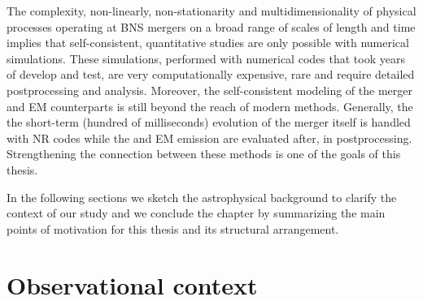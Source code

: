 The complexity, non-linearly, non-stationarity and multidimensionality of physical 
processes operating at \ac{BNS} mergers on a broad range of scales of length and time 
implies that self-consistent, quantitative studies are only possible with numerical 
simulations. These simulations, performed with numerical codes that took years of 
develop and test, are very computationally expensive, rare and require detailed 
postprocessing and analysis. Moreover, the self-consistent modeling of the merger and 
\ac{EM} counterparts is still beyond the reach of modern methods. Generally, the 
the short-term (hundred of milliseconds) evolution of the merger itself 
is handled with \ac{NR} codes while the \nuc{} and \ac{EM} emission are evaluated 
after, in postprocessing. Strengthening the connection between these methods is one of 
the goals of this thesis. 

In the following sections we sketch the astrophysical background to clarify the 
context of our study and we conclude the chapter by summarizing the main points of 
motivation for this thesis and its structural arrangement.


\section{Observational context}


\subsection{\rproc{} \nuc{}}\label{sec:nuc:rproc}

%

